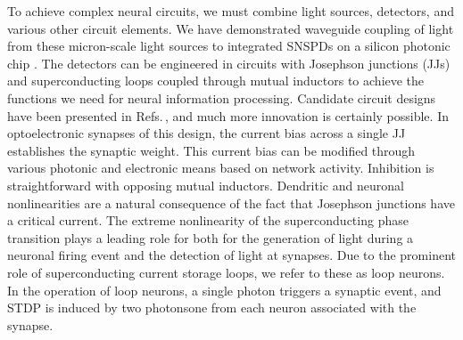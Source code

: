 \documentclass[twocolumn]{article}
\begin{document}
To achieve complex neural circuits, we must combine light sources, detectors, and various other circuit elements. We have demonstrated waveguide coupling of light from these micron-scale light sources to integrated SNSPDs on a silicon photonic chip \cite{buch2017}. The detectors can be engineered in circuits with Josephson junctions (JJs) and superconducting loops coupled through mutual inductors to achieve the functions we need for neural information processing. Candidate circuit designs have been presented in Refs.\,\cite{sh2018b,sh2018c,sh2018d,sh2018}, and much more innovation is certainly possible. In optoelectronic synapses of this design, the current bias across a single JJ establishes the synaptic weight. This current bias can be modified through various photonic and electronic means based on network activity. Inhibition is straightforward with opposing mutual inductors. Dendritic and neuronal nonlinearities are a natural consequence of the fact that Josephson junctions have a critical current. The extreme nonlinearity of the superconducting phase transition plays a leading role for both for the generation of light during a neuronal firing event and the detection of light at synapses. Due to the prominent role of superconducting current storage loops, we refer to these as loop neurons. In the operation of loop neurons, a single photon triggers a synaptic event, and STDP is induced by two photons\textemdash one from each neuron associated with the synapse.
\end{document}
